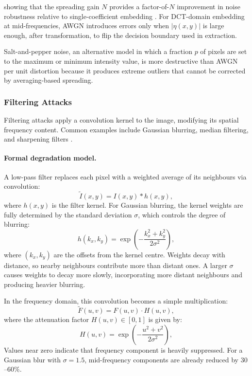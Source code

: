 \documentclass[12pt,a4paper,oneside]{report}
\begin{document}
	showing that the spreading gain $N$ provides a factor-of-$N$ improvement in noise robustness
	relative to single-coefficient embedding \cite{marvel1999spread}. For DCT-domain embedding
	at mid-frequencies, AWGN introduces errors only when $|\eta(x,y)|$ is large enough, after
	transformation, to flip the decision boundary used in extraction.
	
	Salt-and-pepper noise, an alternative model in which a fraction $p$ of pixels are set to
	the maximum or minimum intensity value, is more destructive than AWGN per unit distortion
	because it produces extreme outliers that cannot be corrected by averaging-based spreading.
	
	\subsubsection{Filtering Attacks}
	
	Filtering attacks apply a convolution kernel to the image, modifying 
	its spatial frequency content. Common examples include Gaussian 
	blurring, median filtering, and sharpening filters \cite{gonzalez2008digital}.
	
	\paragraph{Formal degradation model.}
	A low-pass filter replaces each pixel with a weighted average of 
	its neighbours via convolution:
	\begin{equation}
		\tilde{I}(x,y) = I(x,y) * h(x,y),
		\label{eq:lpf}
	\end{equation}
	where $h(x,y)$ is the filter kernel. For Gaussian blurring, the 
	kernel weights are fully determined by the standard deviation 
	$\sigma$, which controls the degree of blurring:
	\begin{equation}
		h(k_x, k_y) = \exp\!\left(-\frac{k_x^2 + k_y^2}{2\sigma^2}\right),
		\label{eq:gaussian_kernel}
	\end{equation}
	where $(k_x, k_y)$ are the offsets from the kernel centre. Weights 
	decay with distance, so nearby neighbours contribute more than 
	distant ones. A larger $\sigma$ causes weights to decay more slowly, 
	incorporating more distant neighbours and producing heavier blurring.
	
	In the frequency domain, this convolution becomes a simple multiplication:
	\begin{equation}
		\tilde{F}(u,v) = F(u,v) \cdot H(u,v),
		\label{eq:lpf_freq}
	\end{equation}
	where the attenuation factor $H(u,v) \in [0,1]$ is given by:
	\begin{equation}
		H(u,v) = \exp\!\left(-\frac{u^2 + v^2}{2\sigma^2}\right),
		\label{eq:gaussian_H}
	\end{equation}
	Values near zero indicate that frequency component is heavily 
	suppressed. For a Gaussian blur with $\sigma = 1.5$, mid-frequency 
	components are already reduced by $30$--$60\%$.
	
\end{document}
